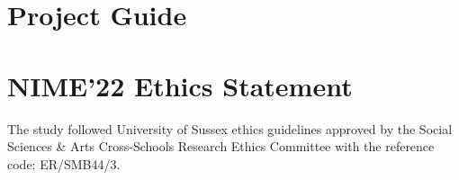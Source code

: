 










\section{Project Guide}



\section{NIME'22 Ethics Statement}\label{sec: polaris-ethics}
The study followed University of Sussex ethics guidelines approved by the Social Sciences \& Arts Cross-Schools Research Ethics Committee with the reference code: ER/SMB44/3.

